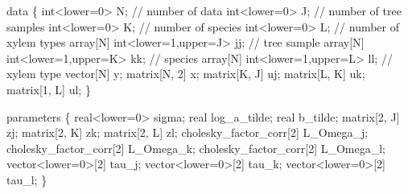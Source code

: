 \documentclass[
  12pt,
  letterpaper,
  DIV=11,
  numbers=noendperiod]{scrartcl}
\newenvironment{Shaded}{\begin{snugshade}}{\end{snugshade}}
\newcommand{\CommentTok}[1]{\textcolor[rgb]{0.37,0.37,0.37}{#1}}
\newcommand{\DataTypeTok}[1]{\textcolor[rgb]{0.68,0.00,0.00}{#1}}
\newcommand{\DecValTok}[1]{\textcolor[rgb]{0.68,0.00,0.00}{#1}}
\newcommand{\KeywordTok}[1]{\textcolor[rgb]{0.00,0.23,0.31}{#1}}
\newcommand{\NormalTok}[1]{\textcolor[rgb]{0.00,0.23,0.31}{#1}}
\begin{document}
\begin{Shaded}
\begin{Highlighting}[]
\KeywordTok{data}\NormalTok{ \{}
  \DataTypeTok{int}\NormalTok{\textless{}}\KeywordTok{lower}\NormalTok{=}\DecValTok{0}\NormalTok{\textgreater{} N; }\CommentTok{// number of data}
  \DataTypeTok{int}\NormalTok{\textless{}}\KeywordTok{lower}\NormalTok{=}\DecValTok{0}\NormalTok{\textgreater{} J; }\CommentTok{// number of tree samples}
  \DataTypeTok{int}\NormalTok{\textless{}}\KeywordTok{lower}\NormalTok{=}\DecValTok{0}\NormalTok{\textgreater{} K; }\CommentTok{// number of species}
  \DataTypeTok{int}\NormalTok{\textless{}}\KeywordTok{lower}\NormalTok{=}\DecValTok{0}\NormalTok{\textgreater{} L; }\CommentTok{// number of xylem types}
  \DataTypeTok{array}\NormalTok{[N] }\DataTypeTok{int}\NormalTok{\textless{}}\KeywordTok{lower}\NormalTok{=}\DecValTok{1}\NormalTok{,}\KeywordTok{upper}\NormalTok{=J\textgreater{} jj; }\CommentTok{// tree sample}
  \DataTypeTok{array}\NormalTok{[N] }\DataTypeTok{int}\NormalTok{\textless{}}\KeywordTok{lower}\NormalTok{=}\DecValTok{1}\NormalTok{,}\KeywordTok{upper}\NormalTok{=K\textgreater{} kk; }\CommentTok{// species}
  \DataTypeTok{array}\NormalTok{[N] }\DataTypeTok{int}\NormalTok{\textless{}}\KeywordTok{lower}\NormalTok{=}\DecValTok{1}\NormalTok{,}\KeywordTok{upper}\NormalTok{=L\textgreater{} ll; }\CommentTok{// xylem type}
  \DataTypeTok{vector}\NormalTok{[N] y;}
  \DataTypeTok{matrix}\NormalTok{[N, }\DecValTok{2}\NormalTok{] x;}
  \DataTypeTok{matrix}\NormalTok{[K, J] uj;}
  \DataTypeTok{matrix}\NormalTok{[L, K] uk;}
  \DataTypeTok{matrix}\NormalTok{[}\DecValTok{1}\NormalTok{, L] ul;}
\NormalTok{\}}

\KeywordTok{parameters}\NormalTok{ \{}
  \DataTypeTok{real}\NormalTok{\textless{}}\KeywordTok{lower}\NormalTok{=}\DecValTok{0}\NormalTok{\textgreater{} sigma;}
  \DataTypeTok{real}\NormalTok{ log\_a\_tilde;}
  \DataTypeTok{real}\NormalTok{ b\_tilde;}
  \DataTypeTok{matrix}\NormalTok{[}\DecValTok{2}\NormalTok{, J] zj;}
  \DataTypeTok{matrix}\NormalTok{[}\DecValTok{2}\NormalTok{, K] zk;}
  \DataTypeTok{matrix}\NormalTok{[}\DecValTok{2}\NormalTok{, L] zl;}
  \DataTypeTok{cholesky\_factor\_corr}\NormalTok{[}\DecValTok{2}\NormalTok{] L\_Omega\_j;}
  \DataTypeTok{cholesky\_factor\_corr}\NormalTok{[}\DecValTok{2}\NormalTok{] L\_Omega\_k;}
  \DataTypeTok{cholesky\_factor\_corr}\NormalTok{[}\DecValTok{2}\NormalTok{] L\_Omega\_l;}
  \DataTypeTok{vector}\NormalTok{\textless{}}\KeywordTok{lower}\NormalTok{=}\DecValTok{0}\NormalTok{\textgreater{}[}\DecValTok{2}\NormalTok{] tau\_j;}
  \DataTypeTok{vector}\NormalTok{\textless{}}\KeywordTok{lower}\NormalTok{=}\DecValTok{0}\NormalTok{\textgreater{}[}\DecValTok{2}\NormalTok{] tau\_k;}
  \DataTypeTok{vector}\NormalTok{\textless{}}\KeywordTok{lower}\NormalTok{=}\DecValTok{0}\NormalTok{\textgreater{}[}\DecValTok{2}\NormalTok{] tau\_l;}
\NormalTok{\}}


\end{Highlighting}
\end{Shaded}
\end{document}
